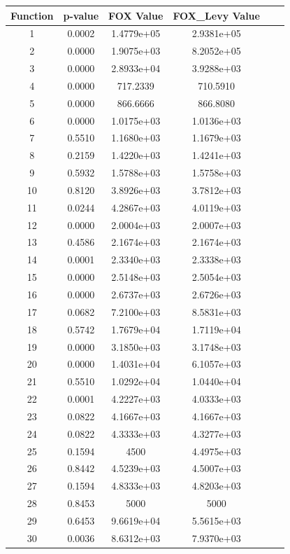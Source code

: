 \documentclass[
]{article}
\begin{document}
\begin{justify}
{\begin{table}[htbp]
  \vspace{1mm}
  \label{tab:results}
  \begin{tabular}{cccccc}
    \toprule
    Function & p-value & FOX Value & FOX\_Levy Value \\
    \midrule
    1 & 0.0002 & 1.4779e+05 &  2.9381e+05 \\
    2 & 0.0000 & 1.9075e+03 & 8.2052e+05 \\
    3 & 0.0000 & 2.8933e+04 & 3.9288e+03 \\
    4 & 0.0000 & 717.2339 & 710.5910 \\
    5 & 0.0000 & 866.6666 & 866.8080 \\
    6 & 0.0000 & 1.0175e+03 & 1.0136e+03 \\
    7 & 0.5510 & 1.1680e+03 &  1.1679e+03 \\
    8 & 0.2159 & 1.4220e+03 & 1.4241e+03 \\
    9 & 0.5932 & 1.5788e+03 & 1.5758e+03 \\
    10 & 0.8120 & 3.8926e+03 & 3.7812e+03 \\
    11 & 0.0244 & 4.2867e+03 & 4.0119e+03 \\
    12 & 0.0000 & 2.0004e+03 & 2.0007e+03 \\
    13 & 0.4586 & 2.1674e+03 & 2.1674e+03 \\
    14 & 0.0001 & 2.3340e+03 & 2.3338e+03 \\
    15 & 0.0000 & 2.5148e+03 & 2.5054e+03 \\
    16 & 0.0000 & 2.6737e+03 & 2.6726e+03 \\
    17 & 0.0682 & 7.2100e+03 & 8.5831e+03 \\
    18 & 0.5742 & 1.7679e+04 & 1.7119e+04 \\
    19 & 0.0000 & 3.1850e+03 & 3.1748e+03 \\
    20 & 0.0000 & 1.4031e+04 & 6.1057e+03\\
    21 & 0.5510 & 1.0292e+04 & 1.0440e+04 \\
    22 & 0.0001 & 4.2227e+03 & 4.0333e+03 \\
    23 & 0.0822 & 4.1667e+03 & 4.1667e+03 \\
    24 & 0.0822 & 4.3333e+03 & 4.3277e+03 \\
    25 & 0.1594 & 4500 &  4.4975e+03 \\
    26 & 0.8442 & 4.5239e+03 & 4.5007e+03 \\
    27 & 0.1594 &  4.8333e+03 & 4.8203e+03 \\
    28 & 0.8453 & 5000 & 5000 \\
    29 & 0.6453 & 9.6619e+04 & 5.5615e+03 \\
    30 & 0.0036 & 8.6312e+03 & 7.9370e+03 \\
    \bottomrule
  \end{tabular}
\end{table}

}
\end{justify}
\end{document}
